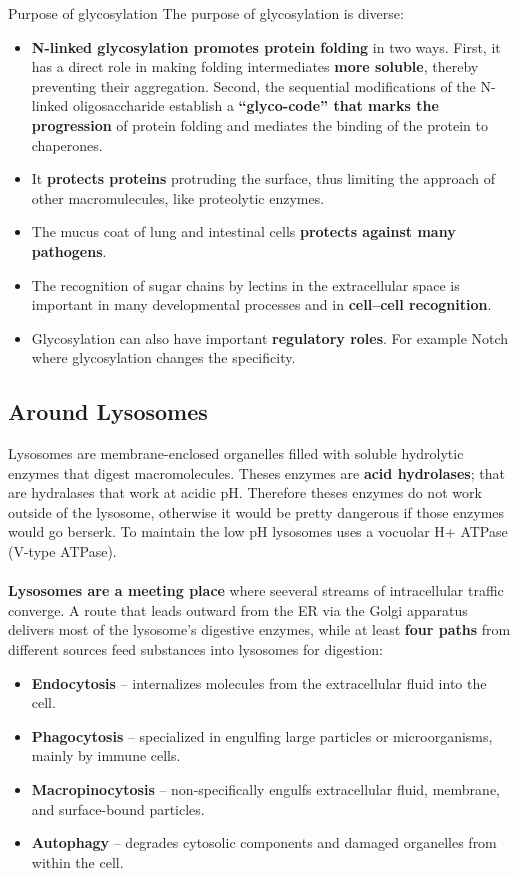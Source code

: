\documentclass[../main.tex]{subfiles}
\begin{document}
\begin{RemarkWithTitel}{Purpose of glycosylation}
	The purpose of glycosylation is diverse: 
	\begin{itemize}
		\item  \textbf{N-linked glycosylation promotes protein folding} in two ways. First, it has a direct role in making folding intermediates \textbf{more soluble}, thereby preventing their aggregation. Second, the sequential modifications of the N-linked oligosaccharide establish a \textbf{“glyco-code” that marks the progression} of protein folding and mediates the binding of the protein to chaperones. 
		\item It \textbf{protects proteins} protruding the surface, thus limiting the approach of other macromulecules, like proteolytic enzymes. 
		\item The mucus coat of lung and intestinal cells \textbf{protects against many pathogens}.
		\item The recognition of sugar chains by lectins in the extracellular space is important in many developmental processes and in \textbf{cell–cell recognition}. 
		\item Glycosylation can also have important \textbf{regulatory roles}. For example Notch where glycosylation changes the specificity. 
	\end{itemize}
\end{RemarkWithTitel}

\subsection{Around Lysosomes}

Lysosomes are membrane-enclosed organelles filled with soluble hydrolytic enzymes that digest macromolecules. Theses enzymes are \textbf{acid hydrolases}; that are hydralases that work at acidic pH. Therefore theses enzymes do  not work outside of the lysosome, otherwise it would be pretty dangerous if those enzymes would go berserk. To maintain the low pH lysosomes uses a vocuolar H+ ATPase (V-type ATPase). \\
\\
\textbf{Lysosomes are a meeting place} where seeveral streams of intracellular traffic converge. A route that leads outward from the ER via the Golgi apparatus delivers most of the lysosome’s digestive enzymes, while at least \textbf{four paths} from different sources feed substances into lysosomes for digestion: 
\begin{itemize}
	\item \textbf{Endocytosis} – internalizes molecules from the extracellular fluid into the cell.
	\item \textbf{Phagocytosis} – specialized in engulfing large particles or microorganisms, mainly by immune cells.
	\item \textbf{Macropinocytosis} – non-specifically engulfs extracellular fluid, membrane, and surface-bound particles.
	\item \textbf{Autophagy} – degrades cytosolic components and damaged organelles from within the cell.
\end{itemize}
\end{document}
